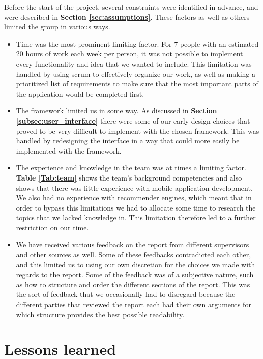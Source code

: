 Before the start of the project, several constraints were identified in advance, and were described in \textbf{Section \ref{sec:assumptions}}. These factors as well as others limited the group in various ways.

\begin{itemize}
\item Time was the most prominent limiting factor. For 7 people with an estimated 20 hours of work each week per person, it was not possible to implement every functionality and idea that we wanted to include. This limitation was handled by using scrum to effectively organize our work, as well as making a prioritized list of requirements to make sure that the most important parts of the application would be completed first.

\item The framework limited us in some way. As discussed in \textbf{Section \ref{subsec:user_interface}} there were some of our early design choices that proved to be very difficult to implement with the chosen framework. This was handled by redesigning the interface in a way that could more easily be implemented with the framework. 

\item The experience and knowledge in the team was at times a limiting factor. \textbf{Table \ref{Tab:team}} shows the team's background competencies and also shows that there was little experience with mobile application development. We also had no experience with recommender engines, which meant that in order to bypass this limitations we had to allocate some time to research the topics that we lacked knowledge in. This limitation therefore led to a further restriction on our time.

\item We have received various feedback on the report from different supervisors and other sources as well. Some of these feedbacks contradicted each other, and this limited us to using our own discretion for the choices we made with regards to the report. Some of the feedback was of a subjective nature, such as how to structure and order the different sections of the report. This was the sort of feedback that we occasionally had to disregard because the different parties that reviewed the report each had their own arguments for which structure provides the best possible readability.

\end{itemize}

\section{Lessons learned}

